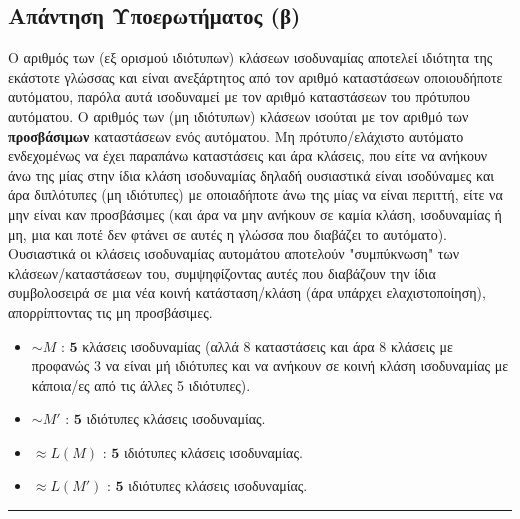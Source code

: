 \subsection{Απάντηση Υποερωτήματος (β)}
\label{ssec:Solution_2.2}
\doublespacing


Ο αριθμός των (εξ ορισμού ιδιότυπων) κλάσεων ισοδυναμίας αποτελεί ιδιότητα της εκάστοτε γλώσσας και είναι
ανεξάρτητος από τον αριθμό καταστάσεων οποιουδήποτε αυτόματου, παρόλα αυτά ισοδυναμεί με τον αριθμό καταστάσεων του
πρότυπου αυτόματου.
Ο αριθμός των (μη ιδιότυπων) κλάσεων ισούται με τον αριθμό των \textbf{προσβάσιμων} καταστάσεων ενός αυτόματου.
Μη πρότυπο/ελάχιστο αυτόματο ενδεχομένως να έχει παραπάνω καταστάσεις και άρα κλάσεις, που είτε να ανήκουν άνω της
μίας στην ίδια κλάση ισοδυναμίας δηλαδή ουσιαστικά είναι ισοδύναμες και άρα διπλότυπες (μη ιδιότυπες) με
οποιαδήποτε άνω της μίας να είναι περιττή, είτε να μην είναι καν προσβάσιμες (και άρα να μην ανήκουν σε καμία
κλάση, ισοδυναμίας ή μη, μια και ποτέ δεν φτάνει σε αυτές η γλώσσα που διαβάζει το αυτόματο).
Ουσιαστικά οι κλάσεις ισοδυναμίας αυτομάτου αποτελούν "συμπύκνωση" των κλάσεων/καταστάσεων του, συμψηφίζοντας αυτές
που διαβάζουν την ίδια συμβολοσειρά σε μια νέα κοινή κατάσταση/κλάση (άρα υπάρχει ελαχιστοποίηση), απορρίπτοντας
τις μη προσβάσιμες.


\begin{tcolorbox}[colback=yellow!15!white, colframe=blue!50!white,
	fonttitle=\bfseries\Large, title = Εξήγηση]
	\begin{itemize}
		\itemsep0em
		\item $\sim M$ : $\bm{5}$ κλάσεις ισοδυναμίας (αλλά 8 καταστάσεις και άρα 8 κλάσεις με προφανώς 3 να είναι
		μή ιδιότυπες και να ανήκουν σε κοινή κλάση ισοδυναμίας με κάποια/ες από τις άλλες 5 ιδιότυπες).

		\item $\sim M'$ : $\bm{5}$ ιδιότυπες κλάσεις ισοδυναμίας.

		\item $\approx L(M)$ : $\bm{5}$ ιδιότυπες κλάσεις ισοδυναμίας.

		\item $\approx L(M')$ : $\bm{5}$ ιδιότυπες κλάσεις ισοδυναμίας.
	\end{itemize}
\end{tcolorbox}



\begin{center}
	\noindent\rule{\linewidth}{0.5pt}
\end{center}
\clearpage
